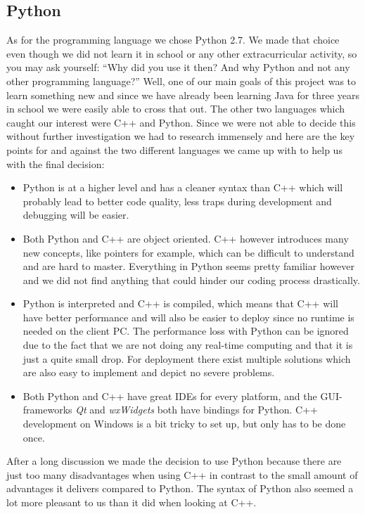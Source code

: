 \subsection{Python}
As for the programming language we chose Python 2.7. We made that choice even though we did not learn it in school or any other extracurricular activity, so you may ask yourself: ``Why did you use it then? And why Python and not any other programming language?'' Well, one of our main goals of this project was to learn something new and since we have already been learning Java for three years in school we were easily able to cross that out. The other two languages which caught our interest were C++ and Python. Since we were not able to decide this without further investigation we had to research immensely and here are the key points for and against the two different languages we came up with to help us with the final decision:


\begin{itemize}
	\item Python is at a higher level and has a cleaner syntax than C++ which will probably lead to better code quality, less traps during development and debugging will be easier.
	\item Both Python and C++ are object oriented. C++ however introduces many new concepts, like pointers for example, which can be difficult to understand and are hard to master. Everything in Python seems pretty familiar however and we did not find anything that could hinder our coding process drastically.
	\item Python is interpreted and C++ is compiled, which means that C++ will have better performance and will also be easier to deploy since no runtime is needed on the client PC\@. The performance loss with Python can be ignored due to the fact that we are not doing any real-time computing and that it is just a quite small drop. For deployment there exist multiple solutions which are also easy to implement and depict no severe problems.
	\item Both Python and C++ have great IDEs for every platform, and the GUI-frameworks \emph{Qt} and \emph{wxWidgets} both have bindings for Python. C++ development on Windows is a bit tricky to set up, but only has to be done once.
\end{itemize}


After a long discussion we made the decision to use Python because there are just too many disadvantages when using C++ in contrast to the small amount of advantages it delivers compared to Python. The syntax of Python also seemed a lot more pleasant to us than it did when looking at C++.

